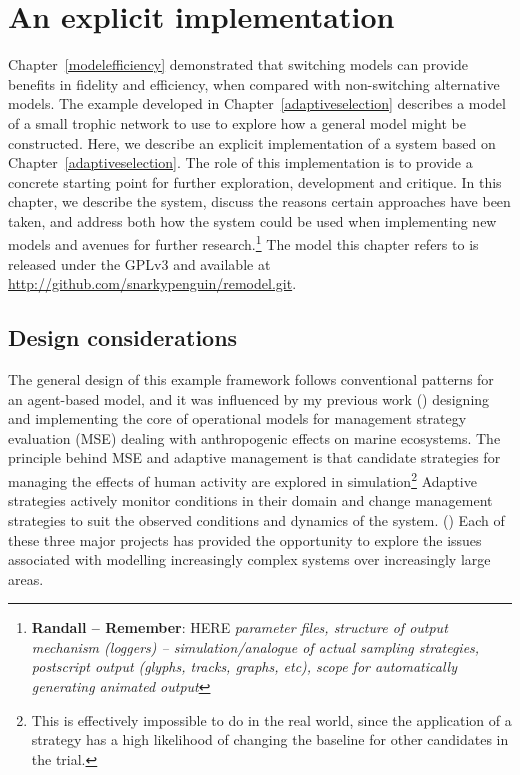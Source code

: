 

\chapter[AN EXPLICIT IMPLEMENTATION]{An explicit implementation}
\WeAreOn{\cfive}\label{explicitmodel}


Chapter~\ref{modelefficiency} demonstrated that switching models can
provide benefits in fidelity and efficiency, when compared with
non-switching alternative models.  The example developed in
Chapter~\ref{adaptiveselection} describes a model of a small trophic
network to use to explore how a general model might be
constructed. Here, we describe an explicit implementation of a system
based on Chapter~\ref{adaptiveselection}. The role of this
implementation is to provide a concrete starting point for further
exploration, development and critique.  In this chapter, we describe
the system, discuss the reasons certain approaches have been taken,
and address both how the system could be used when implementing new
models and avenues for further research.\footnote{ \textbf{Randall --
Remember}: HERE \textit{parameter files, structure of output mechanism
(loggers) -- simulation/analogue of actual sampling strategies,
postscript output (glyphs, tracks, graphs, etc), scope for
automatically generating animated output }} The model this chapter
refers to is released under the GPLv3 and available
at \url{http://github.com/snarkypenguin/remodel.git}.

\section{Design considerations}
The general design of this example framework follows conventional
patterns for an agent-based model, and it was influenced by my
previous work (\cite{lyne1994pmez5, gray2006nws, gray2014}) designing
and implementing the core of operational models for management
strategy evaluation (MSE) dealing with anthropogenic effects on
marine ecosystems.  The principle behind MSE and adaptive management
is that candidate strategies for managing the effects of human
activity are explored in simulation\footnote{This is effectively
  impossible to do in the real world, since the application of a
  strategy has a high likelihood of changing the baseline for other
  candidates in the trial.} Adaptive strategies actively monitor
conditions in their domain and change management strategies to suit
the observed conditions and dynamics of the
system. (\cite{walters1976,smith1993,polacheck1999,sainsbury2000,keith2011})
Each of these three major projects has provided the opportunity to
explore the issues associated with modelling increasingly complex
systems over increasingly large areas.


